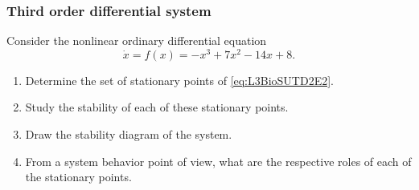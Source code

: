 \subsubsection{Third order differential system} 

Consider the nonlinear ordinary differential equation\begin{equation} \label{eq:L3BioSUTD2E2}
\dot x = f(x) = -x^3 + 7x^2 - 14x + 8.
\end{equation}

\begin{enumerate}
  \item Determine the set of stationary points of \eqref{eq:L3BioSUTD2E2}.
  \item Study the stability of each of these stationary points.
  \item Draw the stability diagram of the system.
  \item From a system behavior point of view, what are the respective roles of each of the stationary points.
\end{enumerate}

